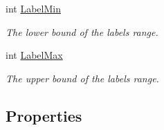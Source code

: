 \begin{DoxyCompactItemize}
int \hyperlink{class_crowdsourcing_models_1_1_data_mapping_ae3668cab21dd19e556898ead95378b38}{Label\+Min}
\begin{DoxyCompactList}\small\item\em The lower bound of the labels range. \end{DoxyCompactList}\item 
int \hyperlink{class_crowdsourcing_models_1_1_data_mapping_a952ec7abc5b934a2f24ddd333478a4c9}{Label\+Max}
\begin{DoxyCompactList}\small\item\em The upper bound of the labels range. \end{DoxyCompactList}\end{DoxyCompactItemize}
\subsection*{Properties}
